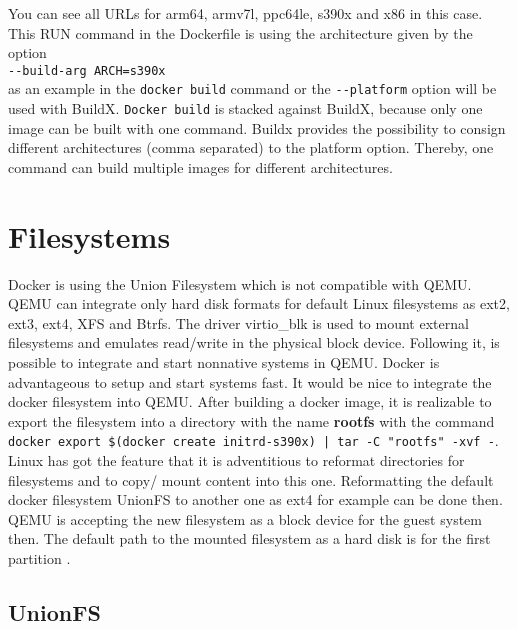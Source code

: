You can see all URLs for arm64, armv7l, ppc64le, s390x and x86 in this case. This RUN command in the Dockerfile is using the architecture given by the option \\
\lstinline!--build-arg ARCH=s390x! \\
as an example in the \lstinline!docker build! command or the \lstinline!--platform! option will be used with BuildX.
\lstinline!Docker build! is stacked against BuildX, because only one image can be built with one command.
Buildx provides the possibility to consign different architectures (comma separated) to the platform option. Thereby, one command can build multiple images for different architectures.

\section{Filesystems}\label{FileSystems}

Docker is using the Union Filesystem which is not compatible with QEMU. \\
QEMU can integrate only hard disk formats for default Linux filesystems as ext2, ext3, ext4, XFS and Btrfs. 
The driver virtio\_blk is used to mount external filesystems and emulates read/write in the physical block device\cite{Barboza2018}. Following it, is possible to integrate and start nonnative systems in QEMU. 
Docker is advantageous to setup and start systems fast. 
It would be nice to integrate the docker filesystem into QEMU. After building a docker image, it is realizable to export the filesystem into a directory with the name \textbf{rootfs} with the command \\ 
\lstinline!docker export $(docker create initrd-s390x) | tar -C "rootfs" -xvf -!. \\

Linux has got the feature that it is adventitious to reformat directories for filesystems and to copy/ mount content into this one. Reformatting the default docker filesystem UnionFS to another one as ext4 for example can be done then. \\
QEMU is accepting the new filesystem as a block device for the guest system then. The default path to the mounted filesystem as a hard disk is  for the first partition \cite[~p.22]{White2020}.

\subsection{UnionFS}\label{UnionFS}

